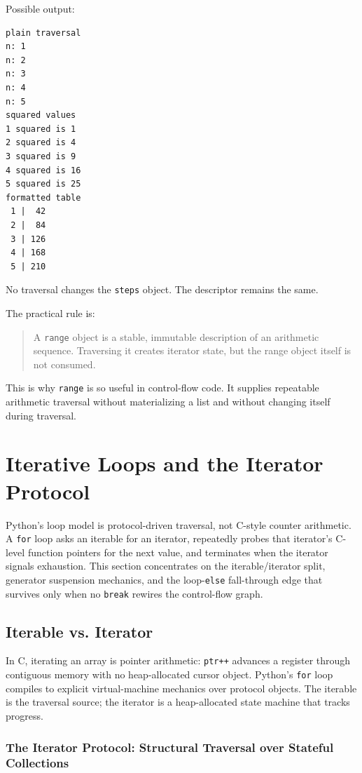 \documentclass[a4paper,twoside]{report}
\begin{document}
Possible output:

\begin{verbatim}
plain traversal
n: 1
n: 2
n: 3
n: 4
n: 5
squared values
1 squared is 1
2 squared is 4
3 squared is 9
4 squared is 16
5 squared is 25
formatted table
 1 |  42
 2 |  84
 3 | 126
 4 | 168
 5 | 210
\end{verbatim}

No traversal changes the \texttt{steps} object. The descriptor remains the same.

The practical rule is:

\begin{quote}
A \texttt{range} object is a stable, immutable description of an arithmetic sequence. Traversing it creates iterator state, but the range object itself is not consumed.
\end{quote}

This is why \texttt{range} is so useful in control-flow code. It supplies repeatable arithmetic traversal without materializing a list and without changing itself during traversal.

\section{Iterative Loops and the Iterator Protocol}

Python's loop model is protocol-driven traversal, not C-style counter arithmetic. A \texttt{for} loop asks an iterable for an iterator, repeatedly probes that iterator's C-level function pointers for the next value, and terminates when the iterator signals exhaustion. This section concentrates on the iterable/iterator split, generator suspension mechanics, and the loop-\texttt{else} fall-through edge that survives only when no \texttt{break} rewires the control-flow graph.


\subsection{Iterable vs. Iterator}

In C, iterating an array is pointer arithmetic: \texttt{ptr++} advances a register through contiguous memory with no heap-allocated cursor object. Python's \texttt{for} loop compiles to explicit virtual-machine mechanics over protocol objects. The iterable is the traversal source; the iterator is a heap-allocated state machine that tracks progress.

\subsubsection{The Iterator Protocol: Structural Traversal over Stateful Collections}
\end{document}
